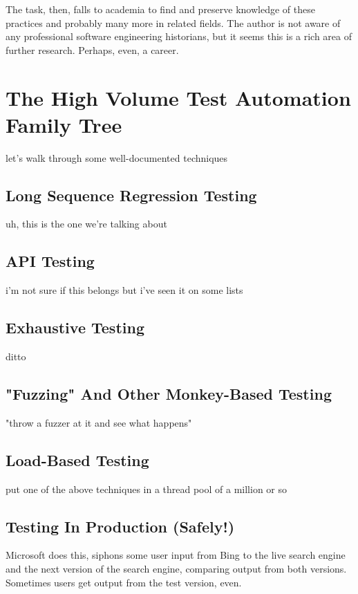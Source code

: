 The task, then, falls to academia to find and preserve knowledge of these practices and probably many more in related fields. The author is not aware of any professional software engineering historians, but it seems this is a rich area of further research. Perhaps, even, a career.

\section{The High Volume Test Automation Family Tree}
let's walk through some well-documented techniques %

\subsection{Long Sequence Regression Testing}
uh, this is the one we're talking about \citep{lee1996principles} %

\subsection{API Testing}
i'm not sure if this belongs but i've seen it on some lists %

\subsection{Exhaustive Testing}
ditto %

\subsection{"Fuzzing" And Other Monkey-Based Testing}
 "throw a fuzzer at it and see what happens" %

\subsection{Load-Based Testing}
put one of the above techniques in a thread pool of a million or so %

\subsection{Testing In Production (Safely!)}
Microsoft does this, siphons some user input from Bing to the live search engine and the next version of the search engine, comparing output from both versions. Sometimes users get output from the test version, even. %

